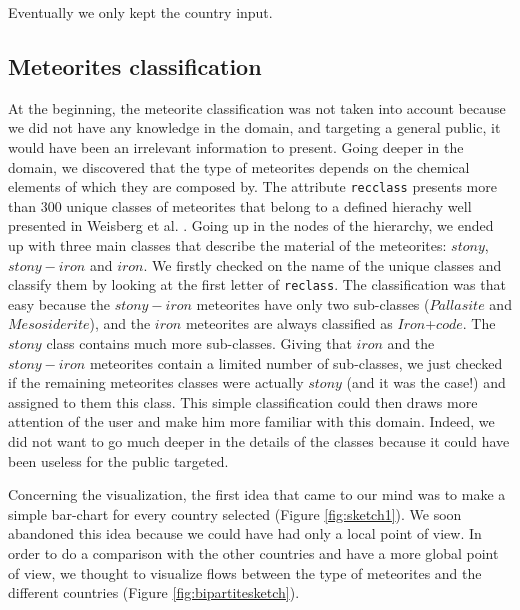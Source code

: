 \documentclass[10pt,conference,compsocconf]{IEEEtran}
\begin{document}
Eventually we only kept the country input.

\subsection{Meteorites classification}
At the beginning, the meteorite classification was not taken into account because we did not have any knowledge in the domain, and targeting a general public, it would have been an irrelevant information to present. Going deeper in the domain, we discovered that the type of meteorites depends on the chemical elements of which they are composed by. The attribute \texttt{recclass} presents more than 300 unique classes of meteorites that belong to a defined hierachy well presented in Weisberg et al.  \cite{weisberg_systematics_2006}.
Going up in the nodes of the hierarchy, we ended up with three main classes that describe the material of the meteorites: $stony$, $stony-iron$ and $iron$. 
We firstly checked on the name of the unique classes and classify them by looking at the first letter of \texttt{reclass}. The classification was that easy because the $stony-iron$ meteorites have only two sub-classes ($Pallasite$ and $Mesosiderite$), and the $iron$ meteorites are always classified as $Iron$+$code$. The $stony$ class contains much more sub-classes. Giving that  $iron$ and the $stony-iron$ meteorites contain a limited number of sub-classes, we just checked if the remaining meteorites classes were actually $stony$ (and it was the case!) and assigned to them this class. This simple classification could then draws more attention of the user and make him more familiar with this domain. Indeed, we did not want to go much deeper in the details of the classes because it could have been useless for the public targeted.

Concerning the visualization, the first idea that  came to our mind  was to make a simple bar-chart for every country selected (Figure \ref{fig:sketch1}). 
We soon abandoned this idea because we could have had only a local point of view. In order to do a comparison with the other countries and have a more global point of view, we thought to visualize flows between the type of meteorites and the different countries (Figure \ref{fig:bipartitesketch}). 
\end{document}
